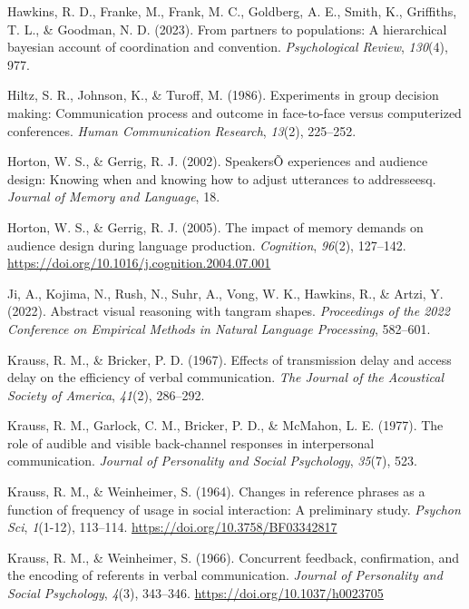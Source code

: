 \documentclass[
  english,
]{article}
\newlength{\cslhangindent}
\newenvironment{CSLReferences}[2] %
{\begin{list}{}{%
			\setlength{\itemindent}{0pt}
			\setlength{\leftmargin}{0pt}
			\setlength{\parsep}{0pt}
			\ifodd #1
			\setlength{\leftmargin}{\cslhangindent}
			\setlength{\itemindent}{-1\cslhangindent}
			\fi
			\setlength{\itemsep}{#2\baselineskip}}}
	{\end{list}}
\begin{document}
\begin{CSLReferences}{1}{0}
Hawkins, R. D., Franke, M., Frank, M. C., Goldberg, A. E., Smith, K., Griffiths, T. L., \& Goodman, N. D. (2023). From partners to populations: A hierarchical bayesian account of coordination and convention. \emph{Psychological Review}, \emph{130}(4), 977.

Hiltz, S. R., Johnson, K., \& Turoff, M. (1986). Experiments in group decision making: Communication process and outcome in face-to-face versus computerized conferences. \emph{Human Communication Research}, \emph{13}(2), 225--252.

Horton, W. S., \& Gerrig, R. J. (2002). {SpeakersÕ} experiences and audience design: Knowing when and knowing how to adjust utterances to addresseesq. \emph{Journal of Memory and Language}, 18.

Horton, W. S., \& Gerrig, R. J. (2005). The impact of memory demands on audience design during language production. \emph{Cognition}, \emph{96}(2), 127--142. \url{https://doi.org/10.1016/j.cognition.2004.07.001}

Ji, A., Kojima, N., Rush, N., Suhr, A., Vong, W. K., Hawkins, R., \& Artzi, Y. (2022). Abstract visual reasoning with tangram shapes. \emph{Proceedings of the 2022 Conference on Empirical Methods in Natural Language Processing}, 582--601.

Krauss, R. M., \& Bricker, P. D. (1967). Effects of transmission delay and access delay on the efficiency of verbal communication. \emph{The Journal of the Acoustical Society of America}, \emph{41}(2), 286--292.

Krauss, R. M., Garlock, C. M., Bricker, P. D., \& McMahon, L. E. (1977). The role of audible and visible back-channel responses in interpersonal communication. \emph{Journal of Personality and Social Psychology}, \emph{35}(7), 523.

Krauss, R. M., \& Weinheimer, S. (1964). Changes in reference phrases as a function of frequency of usage in social interaction: A preliminary study. \emph{Psychon Sci}, \emph{1}(1-12), 113--114. \url{https://doi.org/10.3758/BF03342817}

Krauss, R. M., \& Weinheimer, S. (1966). Concurrent feedback, confirmation, and the encoding of referents in verbal communication. \emph{Journal of Personality and Social Psychology}, \emph{4}(3), 343--346. \url{https://doi.org/10.1037/h0023705}


\end{CSLReferences}
\end{document}
